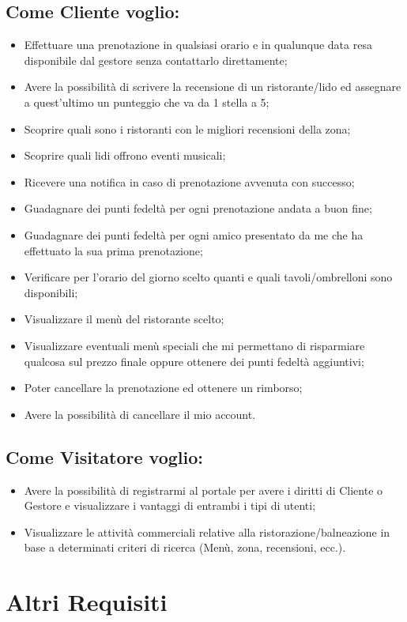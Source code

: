 \documentclass[a4paper]{article}
\begin{document}
\subsection{Come Cliente voglio:}
\begin{itemize}
\item Effettuare una prenotazione in qualsiasi orario e in qualunque data resa disponibile dal gestore senza contattarlo direttamente;
\item Avere la possibilità di scrivere la recensione di un ristorante/lido ed assegnare a quest'ultimo un punteggio che va da 1 stella a 5;
\item Scoprire quali sono i ristoranti con le migliori recensioni della zona;
\item Scoprire quali lidi offrono eventi musicali;
\item Ricevere una notifica in caso di prenotazione avvenuta con successo;
\item Guadagnare dei punti fedeltà per ogni prenotazione andata a buon fine;
\item Guadagnare dei punti fedeltà per ogni amico presentato da me che ha effettuato la sua prima prenotazione;
\item Verificare per l'orario del giorno scelto quanti e quali tavoli/ombrelloni sono disponibili;
\item Visualizzare il menù del ristorante scelto;
\item Visualizzare eventuali menù speciali che mi permettano di risparmiare qualcosa sul prezzo finale oppure ottenere dei punti fedeltà aggiuntivi;
\item Poter cancellare la prenotazione ed ottenere un rimborso;
\item Avere la possibilità di cancellare il mio account.
\end{itemize}

\subsection{Come Visitatore voglio:}
\begin{itemize}
\item Avere la possibilità di registrarmi al portale per avere i diritti di Cliente o Gestore e visualizzare i vantaggi di entrambi i tipi di utenti;

\item Visualizzare le attività commerciali relative alla ristorazione/balneazione in base a determinati criteri di ricerca (Menù, zona, recensioni, ecc.).
\end{itemize}
\section{Altri Requisiti}
\end{document}
